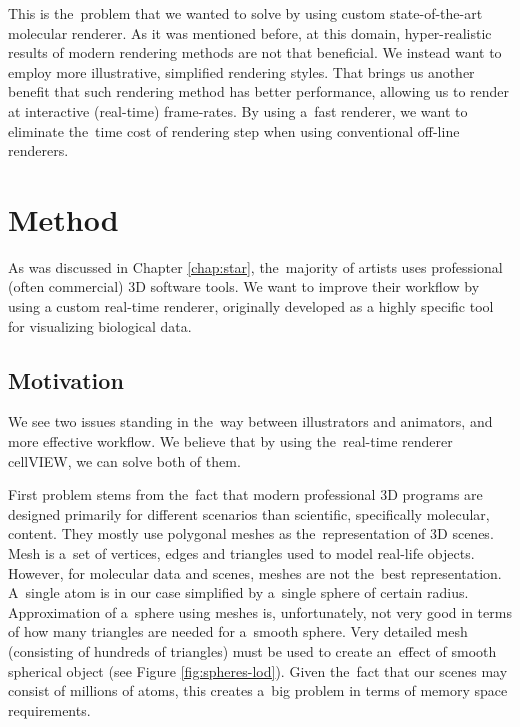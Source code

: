 \documentclass[
  digital, %
  table,   %
  nolof,     %
  nolot,     %
  oneside,
]{fithesis3}
\begin{document}
This is the problem that we wanted to solve by using custom state-of-the-art molecular renderer. As it was mentioned before, at this domain, hyper-realistic results of modern rendering methods are not that beneficial. We instead want to employ more illustrative, simplified rendering styles. That brings us another benefit that such rendering method has better performance, allowing us to render at interactive (real-time) frame-rates. By using a fast renderer, we want to eliminate the time cost of rendering step when using conventional off-line renderers.

\chapter{Method}
\label{chap:method}
As was discussed in Chapter \ref{chap:star}, the majority of artists uses professional (often commercial) 3D software tools. We want to improve their workflow by using a custom real-time renderer, originally developed as a highly specific tool for visualizing biological data.


\section{Motivation}
We see two issues standing in the way between illustrators and animators, and more effective workflow. We believe that by using the real-time renderer cellVIEW, we can solve both of them.

First problem stems from the fact that modern professional 3D programs are designed primarily for different scenarios than scientific, specifically molecular, content. They mostly use polygonal meshes as the representation of 3D scenes. Mesh is a set of vertices, edges and triangles used to model real-life objects. However, for molecular data and scenes, meshes are not the best representation. A single atom is in our case simplified by a single sphere of certain radius. Approximation of a sphere using meshes is, unfortunately, not very good in terms of how many triangles are needed for a smooth sphere. Very detailed mesh (consisting of hundreds of triangles) must be used to create an effect of smooth spherical object (see Figure \ref{fig:spheres-lod}). Given the fact that our scenes may consist of millions of atoms, this creates a big problem in terms of memory space requirements.
\end{document}
